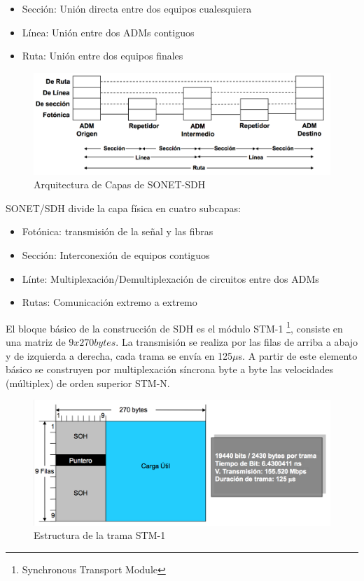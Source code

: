 \documentclass[10pt,portrait, twocolumn]{article}
\begin{document}
	\begin{itemize}
		\item Sección: Unión directa entre dos equipos cualesquiera
		\item Línea: Unión entre dos ADMs contiguos
		\item Ruta: Unión entre dos equipos finales
	\end{itemize}
	
	\begin{figure}[!ht]
 		\centering
  		 \includegraphics[scale = 0.4]{images/Arquitectura}
		\caption{Arquitectura de Capas de SONET-SDH}
	\end{figure}
	
SONET/SDH divide la capa física en cuatro subcapas:

	\begin{itemize}
		\item Fotónica: transmisión de la señal y las fibras
		\item Sección: Interconexión de equipos contiguos
		\item Línte: Multiplexación/Demultiplexación de circuitos entre dos ADMs
		\item Rutas: Comunicación extremo a extremo
	\end{itemize}
	
El bloque básico de la construcción de SDH es el módulo STM-1 \footnote{Synchronous Transport Module}, consiste en una matriz de $9x270 bytes$. La transmisión se realiza por las filas de arriba a abajo y de izquierda a derecha, cada trama se envía en 125$\mu$s. A partir de este elemento básico se construyen por multiplexación síncrona byte a byte las velocidades (múltiplex) de orden superior STM-N.
	
	\begin{figure}[!ht]
 		\centering
  		 \includegraphics[scale = 0.4]{images/TramaSMT}
		\caption{Estructura de la trama STM-1}
	\end{figure}
	
\end{document}
